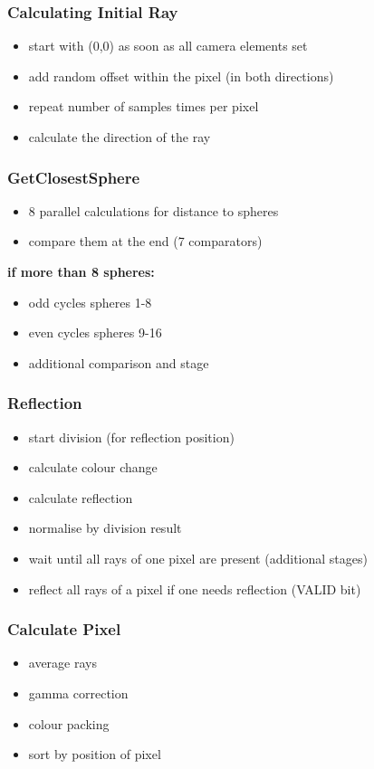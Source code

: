 \documentclass{beamer}
\begin{document}
\begin{frame} %
	\frametitle{Calculating Initial Ray} %
	\begin{itemize}
		\item start with (0,0) as soon as all camera elements set
		\item add random offset within the pixel (in both directions)
		\item repeat number of samples times per pixel
		\item calculate the direction of the ray
	\end{itemize}
\end{frame}

\begin{frame} %
	\frametitle{GetClosestSphere } %
	\begin{itemize}
		\item 8 parallel calculations for distance to spheres
		\item compare them at the end (7 comparators)
	\end{itemize}
	\textbf{if more than 8 spheres:}
	\begin{itemize}
		\item odd cycles spheres 1-8
		\item even cycles spheres 9-16
		\item additional comparison and stage
	\end{itemize}
\end{frame}

\begin{frame} %
	\frametitle{Reflection} %
	\begin{itemize}
		\item start division (for reflection position)
		\item calculate colour change
		\item calculate reflection
		\item normalise by division result
		\item wait until all rays of one pixel are present (additional stages)
		\item reflect all rays of a pixel if one needs reflection (VALID bit)
	\end{itemize}
\end{frame}

\begin{frame}
\frametitle{Calculate Pixel} %
	\begin{itemize}
		\item average rays
		\item gamma correction
		\item colour packing
		\item sort by position of pixel
	\end{itemize}
\end{frame}
\end{document}
